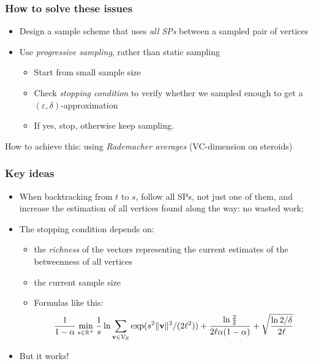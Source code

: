 \begin{frame}
  \frametitle{How to solve these issues}
  \begin{itemize}
    \item Design a sample scheme that uses \emph{all SPs} between a sampled pair
      of vertices
    \pause
    \item Use \emph{progressive sampling}, rather than static sampling
      \begin{itemize}
        \item Start from small sample size
        \item Check \emph{stopping condition} to verify whether we sampled
          enough to get a $(\varepsilon,\delta)$-approximation
        \item If yes, stop, otherwise keep sampling.
      \end{itemize}
  \end{itemize}
  \pause
  How to achieve this: using \emph{Rademacher averages} (VC-dimension on
  steroids)
\end{frame}

\begin{frame}
  \frametitle{Key ideas}
  \begin{itemize}
    \item When backtracking from $t$ to $s$, follow all SPs, not just one of
      them, and increase the estimation of all vertices found along the way: no
      wasted work;
    \pause
    \item  The stopping condition depends on:
      \begin{itemize}
        \item the \emph{richness} of the vectors representing the current
          estimates of the betweenness of all vertices
        \pause
        \item the current sample size
        \pause
      \item Formulas like this:
        \[
          \frac{1}{1-\alpha}\min_{s\in\mathbb{R}^+}\frac{1}{s}\ln\sum_{\mathbf{v}\in\mathcal{V}_{\cal S}}\mathrm{exp}(s^2\|\mathbf{v}\|^2/(2\ell^2))
          +\frac{\ln\frac{2}{\delta}}{2\ell\alpha(1-\alpha)}+\sqrt{\frac{\ln{2/\delta}}{2\ell}}
        \]
      \end{itemize}
    \pause
    \item But it works!
  \end{itemize}
\end{frame}

